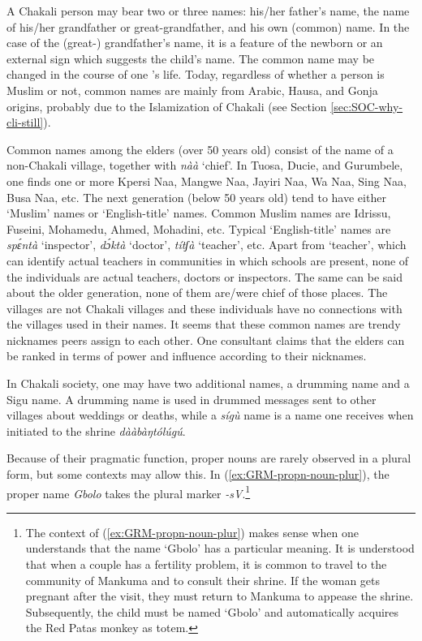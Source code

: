 \begin{exe}
\begin{exe}
\begin{exe}
{\begin{exe}
\begin{exe}
\begin{exe}
\begin{exe}
\begin{exe}
\begin{exe}
A  Chakali person may bear two or three names: his/her father's name, the name
of his/her grandfather or great-grandfather, and his own (common) name. In the
case of the (great-) grandfather's name, it is a feature of the newborn or an
external sign which suggests the child's name.  The common name may be changed
in
the course of one 's life. Today, regardless of whether a  person is Muslim or
not,
common names are mainly from Arabic, Hausa, and Gonja origins, probably due to
the
Islamization of Chakali (see Section \ref{sec:SOC-why-cli-still}).


Common names among the  elders (over 50 years old) consist of the name of a
non-Chakali village,  together with {\it nàà} `chief'. In Tuosa, Ducie, and
Gurumbele, one finds one or more Kpersi Naa, Mangwe Naa, Jayiri Naa, Wa Naa, 
Sing Naa,  Busa Naa, etc. The next generation (below 50 years old) tend to
have either `Muslim' names or `English-title' names. Common Muslim names are
Idrissu, Fuseini, Mohamedu, Ahmed, Mohadini, etc.  Typical 
`English-title' names are {\it spɛ́ntà} `inspector',  {\it dɔ́ktà} `doctor', 
{\it títʃà} `teacher', etc. Apart from `teacher',  which can identify actual
teachers in communities in which schools are present, none of the individuals
are actual teachers, doctors or inspectors. The same can be said about the older
generation, none of them are/were chief of those places. The villages are not
Chakali villages and these individuals have no connections with the villages
used in their names. It seems that these common names are trendy  nicknames
peers  assign to each other. One consultant claims that the elders can be
ranked in terms of power and influence according to their nicknames. 

In Chakali society, one may have two additional names, a drumming name and a
Sigu name. A drumming name is used in drummed messages sent to other villages
about weddings or deaths,  while a {\it  sígù} name is a name one receives
when initiated to the shrine {\it  dààbàŋtólúgú}. 

Because of their pragmatic function,  proper nouns  are rarely observed in a
plural form, but some contexts may allow this. In
(\ref{ex:GRM-propn-noun-plur}), the proper name {\it Gbolo} takes the plural
marker {\it -sV}.\footnote{The context of (\ref{ex:GRM-propn-noun-plur}) makes
sense when one understands that the name `Gbolo' has a particular meaning.  It
is understood that when a couple has a  fertility problem,  it is common to
travel to the community of Mankuma and to consult their shrine. If the woman
gets pregnant after the visit, they must return to Mankuma to appease the
shrine. Subsequently, the child must be named `Gbolo' and automatically acquires
 the Red Patas monkey as  totem.}



\end{exe}
\end{exe}
\end{exe}
\end{exe}
\end{exe}
\end{exe}}
\end{exe}
\end{exe}
\end{exe}
